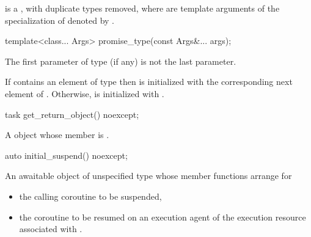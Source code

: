 \pnum
{} is a , with duplicate types removed, where 
are template arguments of the specialization of
 denoted by
.

%
\begin{itemdecl}
template<class... Args>
  promise_type(const Args&... args);
\end{itemdecl}
\begin{itemdescr}
\pnum
\mandates
The first parameter of type  (if any) is not
the last parameter.

\pnum
\effects
If  contains an element of type 
then  is initialized with the corresponding next
element of .
Otherwise,  is initialized with .
\end{itemdescr}

%
\begin{itemdecl}
task get_return_object() noexcept;
\end{itemdecl}
\begin{itemdescr}
\pnum
\returns
A  object whose member  is
.
\end{itemdescr}

%
\begin{itemdecl}
auto initial_suspend() noexcept;
\end{itemdecl}
\begin{itemdescr}
\pnum
\returns
An awaitable object of unspecified type whose
member functions arrange for
\begin{itemize}
\item the calling coroutine to be suspended,
\item the coroutine to be resumed on an execution agent of the
execution resource associated with .
\end{itemize}
\end{itemdescr}

